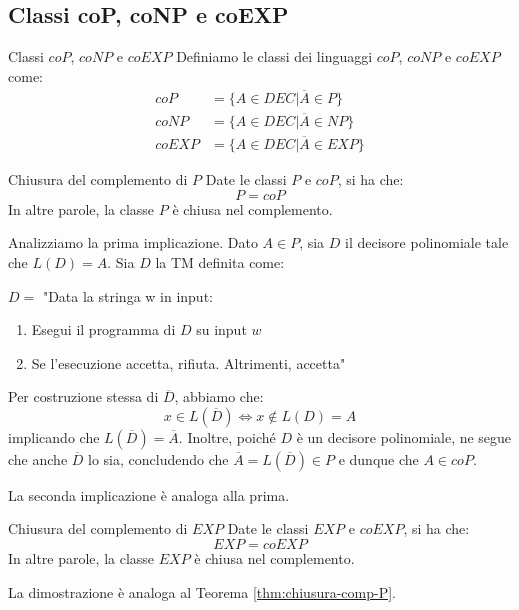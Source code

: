 \subsection{Classi coP, coNP e coEXP}
\begin{Definition}{Classi $coP$, $coNP$ e $coEXP$}{}
Definiamo le classi dei linguaggi $coP$, $coNP$ e $coEXP$ come:
\begin{align*}
coP &= \{A\in DEC | \overline{A}\in P\}\\
coNP &= \{A\in DEC | \overline{A}\in NP\}\\
coEXP &= \{A\in DEC | \overline{A}\in EXP\}
\end{align*}
\end{Definition}

\begin{Thm}{Chiusura del complemento di $P$}{}\label{thm:chiusura-comp-P}
Date le classi $P$ e $coP$, si ha che:
\begin{equation*}
    P = coP    
\end{equation*}
In altre parole, la classe $P$ è chiusa nel complemento.
\begin{demonstration}
Analizziamo la prima implicazione. Dato $A\in P$, sia $D$ il decisore polinomiale tale che $L(D) = A$. Sia $D$ la TM definita come:

$D =$ "Data la stringa w in input:
\begin{enumerate}
    \item Esegui il programma di $D$ su input $w$
    \item Se l’esecuzione accetta, rifiuta. Altrimenti, accetta"
\end{enumerate}
Per costruzione stessa di $\overline{D}$, abbiamo che:
\begin{equation*}
    x\in L(\overline{D})\iff x\notin L(D) = A
\end{equation*}
implicando che $L(\overline{D}) = \overline{A}$. Inoltre, poiché $D$ è un decisore polinomiale, ne segue che anche $\overline{D}$ lo sia, concludendo che $\overline{A} = L(\overline{D})\in P$ e dunque che $A\in coP$.

La seconda implicazione è analoga alla prima.
\end{demonstration}
\end{Thm}

\begin{Thm}{Chiusura del complemento di $EXP$}{}
Date le classi $EXP$ e $coEXP$, si ha che:
\begin{equation*}
    EXP = coEXP    
\end{equation*}
In altre parole, la classe $EXP$ è chiusa nel complemento. 

La dimostrazione è analoga al Teorema \ref{thm:chiusura-comp-P}.
\end{Thm}

